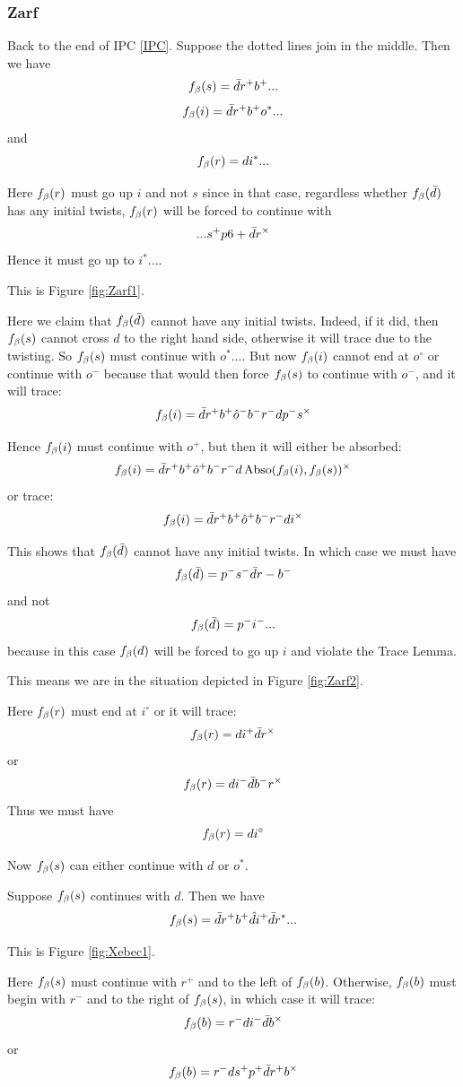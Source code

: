 \subsubsection{Zarf}\label{Zarf}
Back to the end of IPC \ref{IPC}. Suppose the dotted lines join in the middle. Then we have
\[
f_\beta(s) = \bar{d} r^+ b^+...
\]
\[
f_\beta(i) = \bar{d} r^+ b^+ o^*...
\]
and
\[
f_\beta(r) = d i^*...
\]

Here $f_\beta(r)$ must go up $i$ and not $s$ since in that case, regardless whether $f_\beta(\bar{d})$ has any initial twists, $f_\beta(r)$ will be forced to continue with
\[
...s^+ p6+ \bar{d} r^\times
\]
Hence it must go up to $i^*...$. 

This is Figure \ref{fig:Zarf1}.

Here we claim that $f_\beta(\bar{d})$ cannot have any initial twists. Indeed, if it did, then $f_\beta(s)$ cannot cross $d$ to the right hand side, otherwise it will trace due to the twisting. So $f_\beta(s)$ must continue with $o^*...$. But now $f_\beta(i)$ cannot end at $o^\circ$ or continue with $o^-$ because that would then force $f_\beta(s)$ to continue with $o^-$, and it will trace:
\[
f_\beta(i) = \bar{d} r^+ b^+ \hat{o}^- b^- r^- d p^- s^\times
\]

Hence $f_\beta(i)$ must continue with $o^+$, but then it will either be absorbed:
\[
f_\beta(i) = \bar{d} r^+ b^+ \hat{o}^+ b^- r^- d \operatorname{Abso}(f_\beta(i), f_\beta(s))^\times
\]
or trace:
\[
f_\beta(i) = \bar{d} r^+ b^+ \hat{o}^+ b^- r^- d i^\times
\]

This shows that $f_\beta(\bar{d})$ cannot have any initial twists. In which case we must have
\[
f_\beta(\bar{d}) = p^- s^- \bar{d} r- b^-
\]
and not
\[
f_\beta(\bar{d}) = p^- i^-...
\]
because in this case $f_\beta(d)$ will be forced to go up $i$ and violate the Trace Lemma.

This means we are in the situation depicted in Figure \ref{fig:Zarf2}.

Here $f_\beta(r)$ must end at $i^\circ$ or it will trace:
\[
f_\beta(r) = d i^+ \bar{d} r^\times
\]
or
\[
f_\beta(r) = d i^- \bar{d} b^- r^\times
\]
Thus we must have
\[
f_\beta(r) = d i^\circ
\]

Now $f_\beta(s)$ can either continue with $d$ or $o^*$.

\label{Xebec}
Suppose $f_\beta(s)$ continues with $d$. Then we have
\[
f_\beta(s) = \bar{d} r^+ b^+ \hat{d} i^+ \bar{d} r^*...
\]

This is Figure \ref{fig:Xebec1}.

Here $f_\beta(s)$ must continue with $r^+$ and to the left of $f_\beta(b)$. Otherwise, $f_\beta(b)$ must begin with $r^-$ and to the right of $f_\beta(s)$, in which case it will trace:
\[
f_\beta(b) = r^- d i^- \bar{d} b^\times
\]
or
\[
f_\beta(b) = r^- d s^+ p^+ \bar{d} r^+ b^\times
\]

